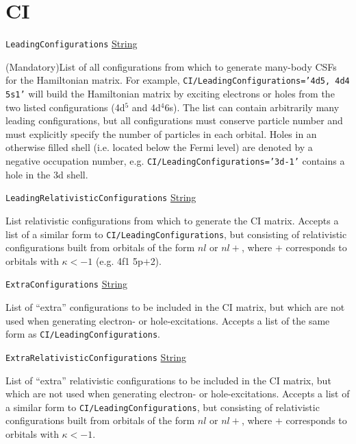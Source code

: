 \documentclass{report}
\begin{document}
\section{CI}

\texttt{LeadingConfigurations} \uline{String}
\begin{adjustwidth}{1cm}{}
(Mandatory)List of all configurations from which to generate many-body CSFs for the 
Hamiltonian matrix. For example, \texttt{CI/LeadingConfigurations='4d5, 4d4 5s1'} will build the 
Hamiltonian matrix by exciting electrons or holes from the two listed configurations (4d$^5$ and 
4d$^4$6s). The list can contain arbitrarily many leading configurations, but all configurations must 
conserve particle number and must explicitly specify the number of particles in each orbital. Holes in 
an otherwise filled shell (i.e. located below the Fermi level) are denoted by a negative occupation 
number, e.g. \texttt{CI/LeadingConfigurations='3d-1'} contains a hole in the 3d shell.
\end{adjustwidth}

\texttt{LeadingRelativisticConfigurations} \uline{String}
\begin{adjustwidth}{1cm}{}
List relativistic configurations from which to generate the CI matrix. Accepts a list of a similar form 
to \texttt{CI/LeadingConfigurations}, but consisting of relativistic configurations built from orbitals 
of the form $nl$ or $nl+$, where $+$ corresponds to orbitals with $\kappa < -1$ (e.g. 4f1 5p$+$2).
\end{adjustwidth}


\texttt{ExtraConfigurations} \uline{String}
\begin{adjustwidth}{1cm}{}
List of ``extra'' configurations to be included in the CI matrix, but which are not used when generating
electron- or hole-excitations. Accepts a list of the same form as \texttt{CI/LeadingConfigurations}.
\end{adjustwidth}

\texttt{ExtraRelativisticConfigurations} \uline{String}
\begin{adjustwidth}{1cm}{}
List of ``extra'' relativistic configurations to be included in the CI matrix, but which are not used 
when generating electron- or hole-excitations. Accepts a list of a similar form to
\texttt{CI/LeadingConfigurations}, but consisting of relativistic configurations built from orbitals of
the form $nl$ or $nl+$, where $+$ corresponds to orbitals with $\kappa < -1$.
\end{adjustwidth}
\end{document}
